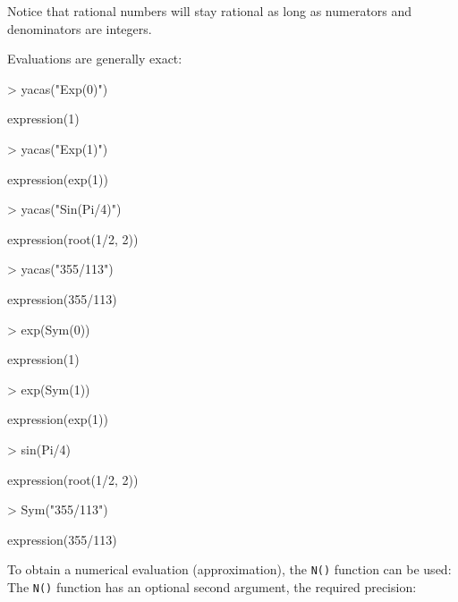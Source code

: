 \documentclass[10pt]{article}
\newcommand{\code}[1]{{\tt #1}}
\begin{document}
Notice that rational numbers will stay rational as long as numerators
and denominators are integers.


Evaluations are generally exact:
\begin{Schunk}
\begin{Sinput}
> yacas("Exp(0)")
\end{Sinput}
\begin{Soutput}
expression(1)
\end{Soutput}
\begin{Sinput}
> yacas("Exp(1)")
\end{Sinput}
\begin{Soutput}
expression(exp(1))
\end{Soutput}
\begin{Sinput}
> yacas("Sin(Pi/4)")
\end{Sinput}
\begin{Soutput}
expression(root(1/2, 2))
\end{Soutput}
\begin{Sinput}
> yacas("355/113")
\end{Sinput}
\begin{Soutput}
expression(355/113)
\end{Soutput}
\end{Schunk}

\begin{Schunk}
\begin{Sinput}
> exp(Sym(0))
\end{Sinput}
\begin{Soutput}
expression(1)
\end{Soutput}
\begin{Sinput}
> exp(Sym(1))
\end{Sinput}
\begin{Soutput}
expression(exp(1))
\end{Soutput}
\begin{Sinput}
> sin(Pi/4)
\end{Sinput}
\begin{Soutput}
expression(root(1/2, 2))
\end{Soutput}
\begin{Sinput}
> Sym("355/113")
\end{Sinput}
\begin{Soutput}
expression(355/113)
\end{Soutput}
\end{Schunk}


To obtain a numerical evaluation (approximation), the \code{N()}
function can be used: The \code{N()} function has an optional second
argument, the required precision:
\end{document}
